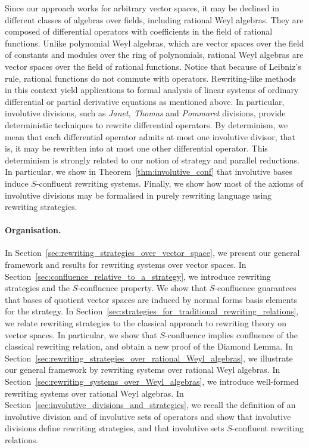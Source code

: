 \documentclass[11pt]{article}
\theoremstyle{definition}
\begin{document}
Since our approach works for arbitrary vector spaces, it may be declined
in different classes of algebras over fields, including rational Weyl
algebras. They are composed of differential operators with coefficients in
the field of rational functions. Unlike polynomial Weyl algebras, which
are vector spaces over the field of constants and modules over the ring
of polynomials, rational Weyl algebras are vector spaces over the field
of rational functions. Notice that because of Leibniz's rule,
rational functions do not commute with operators. Rewriting-like methods
in this context yield applications to formal analysis of linear systems
of ordinary differential or partial derivative equations as mentioned
above. In particular, involutive divisions, such as {\em Janet, Thomas}
and {\em Pommaret} divisions, provide deterministic techniques to rewrite
differential operators. By determinism, we mean that each differential
operator admits at most one involutive divisor, that is, it may be
rewritten into at most one other differential operator. This determinism
is strongly related to our notion of strategy and parallel reductions. In
particular, we show in  Theorem~\ref{thm:involutive_conf} that involutive
bases induce $S$-confluent rewriting systems. Finally, we show how most
of the axioms of involutive divisions may be formalised in purely
rewriting language using rewriting strategies.
\medskip

\paragraph{Organisation.}

In Section~\ref{sec:rewriting_strategies_over_vector_space}, we present
our general framework and results for rewriting systems over vector
spaces. In Section~\ref{sec:confluence_relative_to_a_strategy}, we 
introduce rewriting strategies and the $S$-confluence property. We show
that $S$-confluence guarantees that bases of quotient vector spaces are
induced by normal forms basis elements for the strategy. In
Section~\ref{sec:strategies_for_traditional_rewriting_relations}, we
relate rewriting strategies to the classical approach to rewriting theory
on vector spaces. In particular, we show that $S$-confluence implies
confluence of the classical rewriting relation, and obtain a new proof of
the Diamond Lemma. In
Section~\ref{sec:rewriting_strategies_over_rational_Weyl_algebras}, we
illustrate our general framework by rewriting systems over rational 
Weyl algebras. In Section~\ref{sec:rewriting_systems_over_Weyl_algebras},
we introduce well-formed rewriting systems over rational Weyl algebras. 
In Section~\ref{sec:involutive_divisions_and_strategies}, we recall the
definition of an involutive division and of involutive sets of operators
and show that involutive divisions define rewriting strategies, and that
involutive sets $S$-confluent rewriting relations.
\medskip
\end{document}
